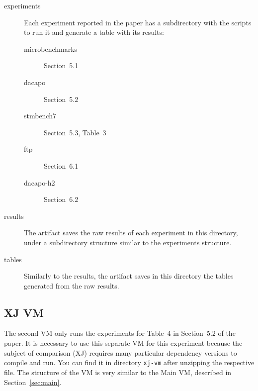 \documentclass[12pt]{article}
\newcommand{\host}[1]{\colorbox{blue!20}{\texttt{\color{black}#1}}}
\begin{document}
\begin{description}
    \item[experiments]  Each experiment reported in the paper has a
        subdirectory with the scripts to run it and generate a table with its
        results:

        \begin{description}

            \item[microbenchmarks] Section~5.1

            \item[dacapo] Section~5.2

            \item[stmbench7] Section~5.3, Table~3

            \item[ftp] Section~6.1

            \item[dacapo-h2] Section~6.2

        \end{description}

    \item[results]  The artifact saves the raw results of each experiment in
        this directory, under a subdirectory structure similar to the
        experiments structure.

    \item[tables]  Similarly to the results, the artifact saves in this
        directory the tables generated from the raw results.

\end{description}

\subsection{XJ VM}
\label{sec:xj}

The second VM only runs the experiments for Table~4 in Section~5.2 of the paper.
It is necessary to use this separate VM for this experiment because the subject of comparison (XJ) requires many particular dependency versions to compile and run.
You can find it in directory \host{xj-vm} after unzipping the
respective file.
The structure of the VM is very similar to the Main VM, described in
Section~\ref{sec:main}.
\end{document}
